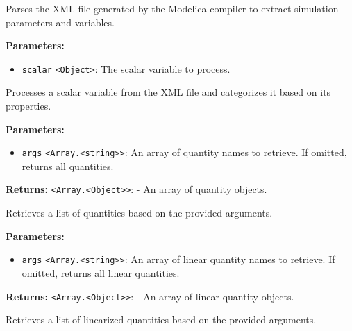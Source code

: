 \documentclass[12pt,a4paper]{article}
\begin{document}
\noindent Parses the XML file generated by the Modelica compiler to extract simulation parameters and variables.

\vspace{5mm}
\noindent {}


\noindent \textbf{Parameters:}
\begin{itemize}
  \item \texttt{scalar} \texttt{<Object>}: The scalar variable to process.
\end{itemize}

\noindent Processes a scalar variable from the XML file and categorizes it based on its properties.

\vspace{5mm}
\noindent {}


\noindent \textbf{Parameters:}
\begin{itemize}
  \item \texttt{args} \texttt{<Array.<string>>}: An array of quantity names to retrieve. If omitted, returns all quantities.
\end{itemize}

\noindent \textbf{Returns:} \texttt{<Array.<Object>>}: - An array of quantity objects.

\noindent Retrieves a list of quantities based on the provided arguments.

\vspace{5mm}
\noindent {}


\noindent \textbf{Parameters:}
\begin{itemize}
  \item \texttt{args} \texttt{<Array.<string>>}: An array of linear quantity names to retrieve. If omitted, returns all linear quantities.
\end{itemize}

\noindent \textbf{Returns:} \texttt{<Array.<Object>>}: - An array of linear quantity objects.

\noindent Retrieves a list of linearized quantities based on the provided arguments.
\end{document}
